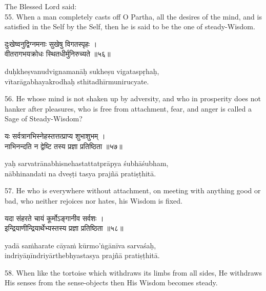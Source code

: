 The Blessed Lord said: \\
55. When a man completely casts off O Partha, all the desires of the mind, and
is satisfied in the Self by the Self, then he is said to be the one of
steady-Wisdom.

\begin{gitaverse}
दुःखेष्वनुद्विग्नमनाः सुखेषु विगतस्पृहः । \\
वीतरागभयक्रोधः स्थितधीर्मुनिरुच्यते ॥५६॥
\end{gitaverse}

\begin{transliteration}
duḥkheṣvanudvignamanāḥ sukheṣu vigataspṛhaḥ, \\
vītarāgabhayakrodhaḥ sthitadhīrmunirucyate.
\end{transliteration}

56. He whose mind is not shaken up by adversity, and who in prosperity does not
hanker after pleasures, who is free from attachment, fear, and anger is called
a Sage of Steady-Wisdom?

\begin{gitaverse}
यः सर्वत्रानभिस्नेहस्तत्तत्प्राप्य शुभाशुभम् । \\
नाभिनन्दति न द्वेष्टि तस्य प्रज्ञा प्रतिष्ठिता ॥५७॥
\end{gitaverse}

\begin{transliteration}
yaḥ sarvatrānabhisnehastattatprāpya śubhāśubham, \\
nābhinandati na dveṣṭi tasya prajñā pratiṣṭhitā.
\end{transliteration}

57. He who is everywhere without attachment, on meeting with anything good or
bad, who neither rejoices nor hates, his Wisdom is fixed.

\begin{gitaverse}
यदा संहरते चायं कूर्मोऽङ्गानीव सर्वशः । \\
इन्द्रियाणीन्द्रियार्थेभ्यस्तस्य प्रज्ञा प्रतिष्ठिता ॥५८॥
\end{gitaverse}

\begin{transliteration}
yadā saṁharate cāyaṁ kūrmo'ṅgānīva sarvaśaḥ, \\
indriyāṇīndriyārthebhyastasya prajñā pratiṣṭhitā.
\end{transliteration}

58. When like the tortoise which withdraws its limbs from all sides, He
withdraws His senses from the sense-objects then His Wisdom becomes steady.

